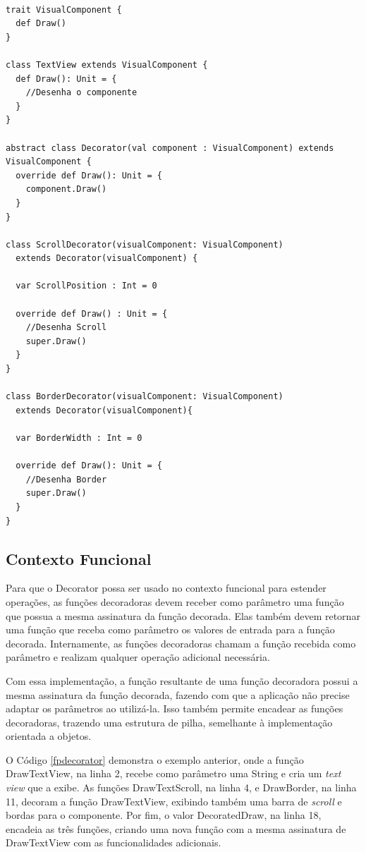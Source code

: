 \begin{lstlisting}[caption={Decorator Orientado a Objetos.},label=oodecorator]

trait VisualComponent {
  def Draw()
}

class TextView extends VisualComponent {
  def Draw(): Unit = {
    //Desenha o componente
  }
}

abstract class Decorator(val component : VisualComponent) extends VisualComponent {
  override def Draw(): Unit = {
    component.Draw()
  }
}

class ScrollDecorator(visualComponent: VisualComponent)
  extends Decorator(visualComponent) {

  var ScrollPosition : Int = 0

  override def Draw() : Unit = {
    //Desenha Scroll
    super.Draw()
  }
}

class BorderDecorator(visualComponent: VisualComponent)
  extends Decorator(visualComponent){

  var BorderWidth : Int = 0

  override def Draw(): Unit = {
    //Desenha Border
    super.Draw()
  }
}

\end{lstlisting}

\subsection*{Contexto Funcional}

Para que o Decorator possa ser usado no contexto 
funcional para estender operações, as funções 
decoradoras devem receber como parâmetro uma função 
que possua a mesma assinatura da função decorada. 
Elas também devem retornar uma função que receba 
como parâmetro os valores de entrada para a 
função decorada. Internamente, as funções decoradoras 
chamam a função recebida como parâmetro e realizam 
qualquer operação adicional necessária. 

Com essa implementação, a função resultante de uma 
função decoradora possui a mesma assinatura da função 
decorada, fazendo com que a aplicação não precise adaptar 
os parâmetros ao utilizá-la. Isso também permite 
encadear as funções decoradoras, trazendo uma estrutura de 
pilha, semelhante à implementação orientada a objetos.

O Código \ref{fpdecorator} demonstra o exemplo anterior, onde 
a função DrawTextView, na linha 2, recebe como parâmetro uma 
String e cria um \textit{text view} que a exibe. As funções 
DrawTextScroll, na linha 4, e DrawBorder, na linha 11, decoram 
a função DrawTextView, exibindo também uma barra de \textit{scroll} 
e bordas para o componente. Por fim, o valor DecoratedDraw, na 
linha 18, encadeia as três funções, criando uma nova função 
com a mesma assinatura de DrawTextView com as funcionalidades 
adicionais.

